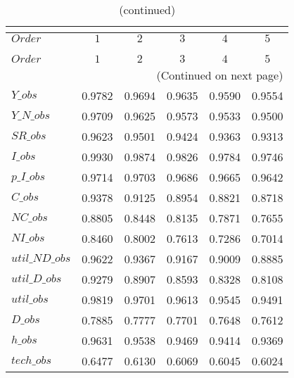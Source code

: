  
\begin{center}
\begin{longtable}{lccccc} 
\caption{COEFFICIENTS OF AUTOCORRELATION}\\
 \label{Table:th_autocorr_matrix}\\
\toprule 
$Order          $	 & 	 $         1$	 & 	 $         2$	 & 	 $         3$	 & 	 $         4$	 & 	 $         5$\\
\midrule \endfirsthead 
\caption{(continued)}\\
 \toprule \\ 
$Order          $	 & 	 $         1$	 & 	 $         2$	 & 	 $         3$	 & 	 $         4$	 & 	 $         5$\\
\midrule \endhead 
\midrule \multicolumn{6}{r}{(Continued on next page)} \\ \bottomrule \endfoot 
\bottomrule \endlastfoot 
$Y\_obs         $	 & 	    0.9782	 & 	    0.9694	 & 	    0.9635	 & 	    0.9590	 & 	    0.9554 \\ 
$Y\_N\_obs      $	 & 	    0.9709	 & 	    0.9625	 & 	    0.9573	 & 	    0.9533	 & 	    0.9500 \\ 
$SR\_obs        $	 & 	    0.9623	 & 	    0.9501	 & 	    0.9424	 & 	    0.9363	 & 	    0.9313 \\ 
$I\_obs         $	 & 	    0.9930	 & 	    0.9874	 & 	    0.9826	 & 	    0.9784	 & 	    0.9746 \\ 
$p\_I\_obs      $	 & 	    0.9714	 & 	    0.9703	 & 	    0.9686	 & 	    0.9665	 & 	    0.9642 \\ 
$C\_obs         $	 & 	    0.9378	 & 	    0.9125	 & 	    0.8954	 & 	    0.8821	 & 	    0.8718 \\ 
$NC\_obs        $	 & 	    0.8805	 & 	    0.8448	 & 	    0.8135	 & 	    0.7871	 & 	    0.7655 \\ 
$NI\_obs        $	 & 	    0.8460	 & 	    0.8002	 & 	    0.7613	 & 	    0.7286	 & 	    0.7014 \\ 
$util\_ND\_obs  $	 & 	    0.9622	 & 	    0.9367	 & 	    0.9167	 & 	    0.9009	 & 	    0.8885 \\ 
$util\_D\_obs   $	 & 	    0.9279	 & 	    0.8907	 & 	    0.8593	 & 	    0.8328	 & 	    0.8108 \\ 
$util\_obs      $	 & 	    0.9819	 & 	    0.9701	 & 	    0.9613	 & 	    0.9545	 & 	    0.9491 \\ 
$D\_obs         $	 & 	    0.7885	 & 	    0.7777	 & 	    0.7701	 & 	    0.7648	 & 	    0.7612 \\ 
$h\_obs         $	 & 	    0.9631	 & 	    0.9538	 & 	    0.9469	 & 	    0.9414	 & 	    0.9369 \\ 
$tech\_obs      $	 & 	    0.6477	 & 	    0.6130	 & 	    0.6069	 & 	    0.6045	 & 	    0.6024 \\ 
\end{longtable}
 \end{center}
